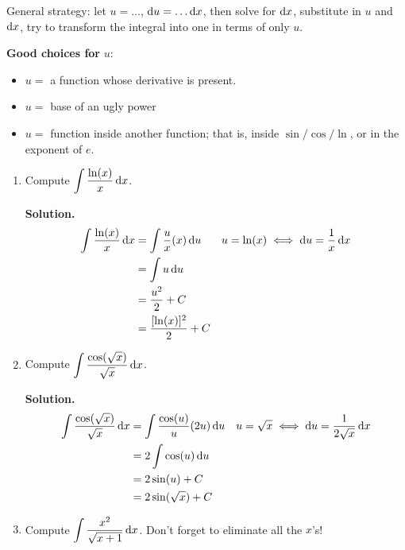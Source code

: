 General strategy: let $ u=\ldots $, $ \odif{u}=\ldots\odif{x} $, then solve for
$ \odif{x} $, substitute in $ u $ and $ \odif{x} $, try to transform the integral into one
in terms of only $ u $.

\textbf{Good choices for} $ u $:
\begin{itemize}
    \item $ u= $ a function whose derivative is present.
    \item $ u= $ base of an ugly power
    \item $ u= $ function inside another function; that is, inside $ \sin/\cos/\ln $,
          or in the exponent of $ e $.
\end{itemize}

\begin{Example}{}{}
    \begin{enumerate}[label=(\roman*)]
        \item Compute $ \displaystyle  \int \frac{\ln(x)}{x} \odif{x} $.

              \textbf{Solution.}
              \begin{align*}
                  \int \frac{\ln(x)}{x} \odif{x}
                   & =\int \frac{u}{x} (x)\odif{u} &  & u=\ln(x)\iff \odif{u}=\frac{1}{x}\odif{x} \\
                   & =\int u\odif{u}                                                              \\
                   & =\frac{u^2}{2} +C                                                            \\
                   & =\frac{[\ln(x)]^2}{2} +C
              \end{align*}
        \item Compute $ \displaystyle \int \frac{\cos(\sqrt{x})}{\sqrt{x}} \odif{x} $.

              \textbf{Solution.}
              \begin{align*}
                  \int \frac{\cos(\sqrt{x})}{\sqrt{x}} \odif{x}
                   & = \int \frac{\cos(u)}{u}(2u) \odif{u} &  & u=\sqrt{x}\iff \odif{u}=\frac{1}{2\sqrt{x}}\odif{x} \\
                   & =2 \int \cos(u)\odif{u}                                                                        \\
                   & =2\sin(u)+C                                                                                    \\
                   & =2\sin(\sqrt{x})+C
              \end{align*}
        \item Compute
              $ \displaystyle \int \frac{x^2}{\sqrt{x+1}} \odif{x} $.
              Don't forget to eliminate all the $ x $'s!


\end{enumerate}
\end{Example}
